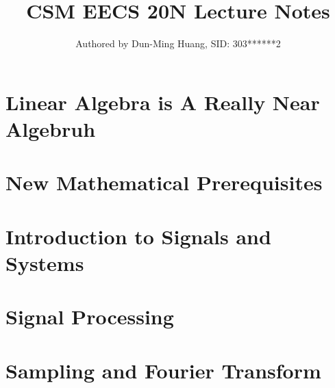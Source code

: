 \documentclass[openany]{book}
\title{CSM EECS 20N Lecture Notes}
\author{Authored by Dun-Ming Huang, SID: 303******2}
\begin{document}
\maketitle
\setcounter{tocdepth}{1}

\tableofcontents
\part{Linear Algebra is A Really Near Algebruh}

\newpage

\newpage

\newpage

\newpage

\newpage

\newpage

\newpage

\newpage


\part{New Mathematical Prerequisites}

\newpage

\newpage

\newpage


\part{Introduction to Signals and Systems}

\newpage

\newpage

\newpage

\newpage

\newpage


\part{Signal Processing}

\newpage

\newpage

\newpage

\newpage

\newpage

\newpage


\part{Sampling and Fourier Transform}

\newpage

\newpage

\newpage

\newpage

\end{document}
